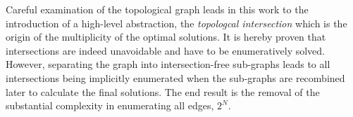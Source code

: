 \documentclass[journal]{IEEEtran}
\begin{document}

Careful examination of the topological graph leads in this work to the introduction of a high-level abstraction, the \textit{topologcal  intersection} which is the origin of the multiplicity of the optimal solutions. It is hereby proven that intersections are indeed unavoidable and have to be enumeratively solved. However, separating the graph into intersection-free sub-graphs leads to all intersections being implicitly enumerated when the sub-graphs are recombined later to calculate the final solutions. The end result is the removal of the substantial complexity in enumerating all edges, $2^N$. 
\end{document}
